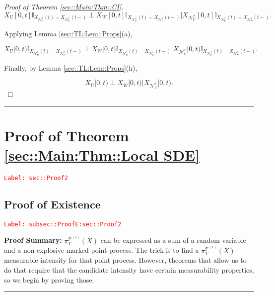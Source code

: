 \documentclass[12pt]{article}
\newcommand{\mb}{\mathbb}
\newcommand{\mc}{\mathcal}
\newcommand{\tr}{\textcolor{red}}
\newcommand{\labe}[1]{\tr{\texttt{Label: #1}}}
\newcommand{\pfsum}{\textbf{Proof Summary: }}
\newcommand{\lin}{\rule{\linewidth}{0.4 pt}}
\renewcommand{\U}{U}							%
\newcommand{\UU}{W}								%
\newcommand{\T}{T}								%
\renewcommand{\t}{t}							%
\newcommand{\proj}{\pi}							%
\newcommand{\X}{X}								%
\newcommand{\dneigh}{\mc{N}^2}					%
\newcommand{\vsi}[1]{^{#1}}						%
\newcommand{\cind}[1]{_{#1}}					%
\newcommand{\tp}[1]{(#1)}						%
\newcommand{\tip}[1]{#1}						%
\newcommand{\ts}[1]{_{#1}}						%
\newcommand{\tree}{\mc{T}}						%
\newcommand{\sln}[1]{^{(#1)}}					%
\newcommand{\dnvind}[1]{_{#1}}					%
\begin{document}
\begin{proof}[Proof of Theorem \ref{sec::Main:Thm::CI}]
\[\X\cind{\U}\tip{[0,\t]}\mb{I}_{\X\cind{\dneigh\dnvind{\U}}\tp{\t} = \X\cind{\dneigh\dnvind{\U}}\tp{\t-}}\perp\X\cind{\UU}\tip{[0,\t]}\mb{I}_{\X\cind{\dneigh\dnvind{\U}}\tp{\t} = \X\cind{\dneigh\dnvind{\U}}\tp{\t-}}\big|\X\cind{\dneigh\dnvind{\U}}\tip{[0,\t]}\mb{I}_{\X\cind{\dneigh\dnvind{\U}}\tp{\t} = \X\cind{\dneigh\dnvind{\U}}\tp{\t-}}.\]

Applying Lemma \ref{sec::TL:Lem::Props}(a),

\[\X\cind{\U}\tip{[0,\t)}\mb{I}_{\X\cind{\dneigh\dnvind{\U}}\tp{\t} = \X\cind{\dneigh\dnvind{\U}}\tp{\t-}}\perp\X\cind{\UU}\tip{[0,\t)}\mb{I}_{\X\cind{\dneigh\dnvind{\U}}\tp{\t} = \X\cind{\dneigh\dnvind{\U}}\tp{\t-}}\big|\X\cind{\dneigh\dnvind{\U}}\tip{[0,\t)}\mb{I}_{\X\cind{\dneigh\dnvind{\U}}\tp{\t} = \X\cind{\dneigh\dnvind{\U}}\tp{\t-}}.\]

Finally, by Lemma \ref{sec::TL:Lem::Props}(h),

\[\X\cind{\U}\tip{[0,\t)}\perp\X\cind{\UU}\tip{[0,\t)}\big|\X\cind{\dneigh\dnvind{\U}}\tip{[0,\t)}.\]
\end{proof}

\lin

\section{Proof of Theorem \ref{sec::Main:Thm::Local SDE}}
\label{sec::Proof2}\labe{sec::Proof2}

\subsection{Proof of Existence}
\label{subsec::ProofE:sec::Proof2}\labe{subsec::ProofE:sec::Proof2}

\pfsum \(\proj\vsi{\tree\sln{1}}\ts{\T}(\X)\) can be expressed as a sum of a random variable and a non-explosive marked point process. The trick is to find a \(\proj\vsi{\tree\sln{1}}\ts{\T}(\X)\)-measurable intensity for that point process. However, theorems that allow us to do that require that the candidate intensity have certain measurability properties, so we begin by proving those.

\lin
\end{document}
